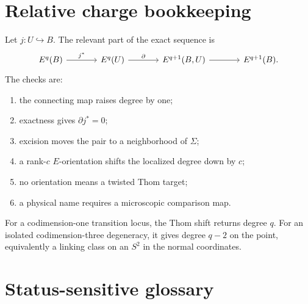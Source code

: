 \documentclass[12pt]{article}
\theoremstyle{definition}
\theoremstyle{remark}
\begin{document}
\section{Relative charge bookkeeping}

Let $j:U\hookrightarrow B$.  The relevant part of the exact sequence is
\begin{equation}
\begin{tikzcd}[column sep=large]
E^q(B) \arrow[r,"j^*"]
& E^q(U) \arrow[r,"\partial"]
& E^{q+1}(B,U) \arrow[r]
& E^{q+1}(B).
\end{tikzcd}
\end{equation}
The checks are:
\begin{enumerate}[leftmargin=2.2em]
  \item the connecting map raises degree by one;
  \item exactness gives $\partial j^*=0$;
  \item excision moves the pair to a neighborhood of $\Sigma$;
  \item a rank-$c$ $E$-orientation shifts the localized degree down by $c$;
  \item no orientation means a twisted Thom target;
  \item a physical name requires a microscopic comparison map.
\end{enumerate}

For a codimension-one transition locus, the Thom shift returns degree $q$.
For an isolated codimension-three degeneracy, it gives degree $q-2$ on the
point, equivalently a linking class on an $S^2$ in the normal coordinates.

\section{Status-sensitive glossary}
\end{document}

